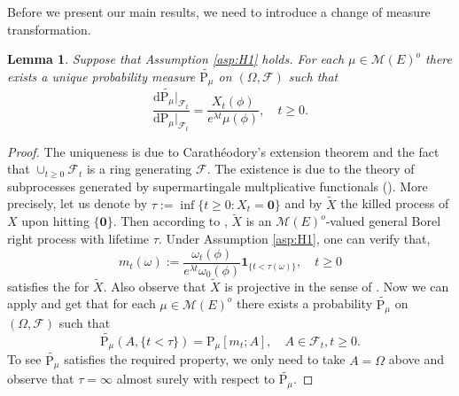\documentclass[12pt,a4paper]{amsart}
\numberwithin{equation}{section}
\theoremstyle{plain}
\newtheorem{lem}[thm]{Lemma}
\newtheorem{prop}[thm]{Proposition}
\theoremstyle{definition}
\theoremstyle{remark}
\begin{document}
	Before we present our main results, we need to introduce a change of measure transformation.
\begin{lem} 
	Suppose that Assumption \eqref{asp:H1} holds.
	For each $\mu \in \mathcal M(E)^o$ there exists a unique probability measure $\widetilde{\mathrm P_\mu}$ on $(\Omega, \mathscr F)$ such that \[\frac{\mathrm d\widetilde{\mathrm P_\mu}|_{\mathscr F_t}}{\mathrm d \mathrm P_\mu |_{\mathscr F_t}} = \frac{X_t(\phi)}{e^{\lambda t}\mu(\phi)}, \quad t\geq 0.\]
\end{lem}
\begin{proof}
	The uniqueness is due to Carath\'eodory's extension theorem and the fact that $\cup_{t\geq 0}\mathscr F_t$ is a ring generating $\mathscr F$.
	The existence is due to the theory of subprocesses generated by supermartingale multplicative functionals (\cite[Section 62]{Sharpe1988General}). 
	More precisely, let us denote by $\tau:= \inf \{t\geq 0: X_t = \mathbf 0\}$ and by $\widetilde X$ the killed process of $X$ upon hitting $\{\mathbf 0\}$. 
	Then according to \cite[Theorem 61.5]{Sharpe1988General}, $\widetilde X$ is an $\mathcal M(E)^o$-valued general Borel right process with lifetime $\tau$.
	Under Assumption \eqref{asp:H1}, one can verify that, \[m_t(\omega):=\frac{\omega_t(\phi)}{e^{\lambda t}\omega_0(\phi)}\mathbf 1_{\{t<\tau(\omega)\}}, \quad t\geq 0\] satisfies the \cite[Hypothesis 62.9]{Sharpe1988General} for $\widetilde X$. 
	Also observe that $\widetilde X$ is projective in the sense of \cite[Definition 62.4]{Sharpe1988General}.  
	Now we can apply \cite[Theorem 62.19]{Sharpe1988General} and get that for each $\mu \in \mathcal M(E)^o$ there exists a probability $\widetilde{\mathrm P_\mu}$ on $(\Omega, \mathscr F)$ such that \[\widetilde {\mathrm P_\mu}  (A, \{t< \tau\}) = \mathrm P_\mu [m_t;A], \quad A\in \mathscr F_t,t\geq 0. \]
	To see $\widetilde {\mathrm P_\mu}$ satisfies the required property, we only need to take $A = \Omega$ above and observe that $\tau = \infty$ almost surely with respect to $\widetilde {\mathrm P_\mu}$.
\end{proof}
\end{document}
